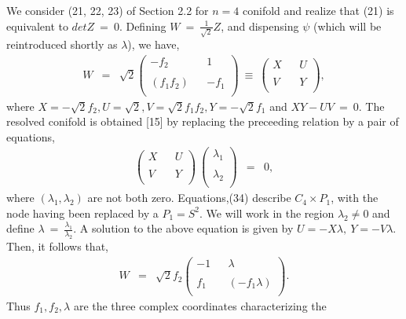 \documentclass[a4paper,12pt]{article}
\begin{document}
We consider (21, 22, 23) of Section 2.2 for $n=4$ conifold and realize that 
(21) is equivalent to $det Z\ =\ 0$. Defining $W\ =\ \frac{1}{\sqrt{2}}Z$, and
dispensing $\psi$ (which will be reintroduced shortly as $\lambda$), 
we have,
\begin{eqnarray}
W&=& \sqrt{2} \left( \begin{array}{lcr}
 -f_2 & & 1 \\
 & &  \\
(f_1f_2) & & -f_1 \\
\end{array} \right) \ \equiv \ \left( \begin{array}{lcr}
X & & U \\
 & & \\
V & & Y \\
\end{array} \right), 
\end{eqnarray} 
where $X=-\sqrt{2}f_2, U=\sqrt{2}, V=\sqrt{2}f_1f_2, Y=-\sqrt{2}f_1$ and 
$XY-UV\ =\ 0$. The resolved conifold is obtained [15] by replacing the
preceeding relation by a pair of equations,
\begin{eqnarray}
\left( \begin{array}{lcr}
X & & U \\
 & & \\
V & & Y \\
\end{array} \right) \ \left( \begin{array}{c}
{\lambda}_1 \\
  \\
{\lambda}_2 \\
\end{array} \right) &=& 0,
\end{eqnarray}
where $({\lambda}_1, {\lambda}_2)$ are not both zero. Equations,(34)
describe $C_4\times P_1$, with the node having been replaced by a $P_1
=S^2$. We  
will work in the region ${\lambda}_2 \neq 0$ and define $\lambda \ =\ 
\frac{{\lambda}_1}{{\lambda}_2}$. A solution to the above equation is given 
by $U=-X\lambda, \ Y=-V\lambda$. Then, it follows that,
\begin{eqnarray}
W&=& \sqrt{2}f_2 \left( \begin{array}{lcr}
-1 & & \lambda \\
  & & \\
f_1 & & (-f_1\lambda) \\
\end{array} \right). 
\end{eqnarray} 
Thus $f_1,f_2,\lambda$ are the three complex coordinates characterizing the
\end{document}
